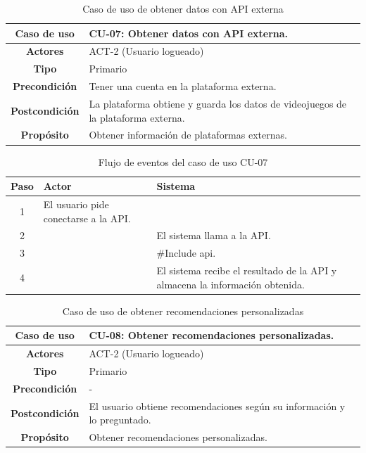 \begin{table}[H]
\centering
\begin{tabular}{|c|p{10cm}|}
\hline
\rowcolor{green!40} \textbf{Caso de uso} & CU-07: Obtener datos con API externa. \\ \hline
\rowcolor{blue!10} \textbf{Actores} & ACT-2 (Usuario logueado) \\ \hline
\rowcolor{blue!10} \textbf{Tipo} & Primario \\ \hline
\rowcolor{blue!10} \textbf{Precondición} & Tener una cuenta en la plataforma externa. \\ \hline
\rowcolor{blue!10} \textbf{Postcondición} & La plataforma obtiene y guarda los datos de videojuegos de la plataforma externa. \\ \hline
\rowcolor{blue!10} \textbf{Propósito} & Obtener información de plataformas externas. \\ \hline
\end{tabular}
\caption{Caso de uso de obtener datos con API externa}
\end{table}

\begin{table}[H]
\centering
\begin{tabular}{|c|p{5cm}|p{5cm}|}
\hline
\rowcolor{green!40} \textbf{Paso} & \textbf{Actor} & \textbf{Sistema} \\ \hline
\rowcolor{blue!10} 1 & El usuario pide conectarse a la API. &  \\ \hline
\rowcolor{blue!10} 2 &  & El sistema llama a la API. \\ \hline
\rowcolor{blue!10} 3 &  & \#Include api. \\ \hline
\rowcolor{blue!10} 4 &  & El sistema recibe el resultado de la API y almacena la información obtenida. \\ \hline
\end{tabular}
\caption{Flujo de eventos del caso de uso CU-07}
\end{table}

\begin{table}[H]
\centering
\begin{tabular}{|c|p{10cm}|}
\hline
\rowcolor{green!40} \textbf{Caso de uso} & CU-08: Obtener recomendaciones personalizadas. \\ \hline
\rowcolor{blue!10} \textbf{Actores} & ACT-2 (Usuario logueado) \\ \hline
\rowcolor{blue!10} \textbf{Tipo} & Primario \\ \hline
\rowcolor{blue!10} \textbf{Precondición} & - \\ \hline
\rowcolor{blue!10} \textbf{Postcondición} & El usuario obtiene recomendaciones según su información y lo preguntado. \\ \hline
\rowcolor{blue!10} \textbf{Propósito} & Obtener recomendaciones personalizadas. \\ \hline
\end{tabular}
\caption{Caso de uso de obtener recomendaciones personalizadas}
\end{table}

